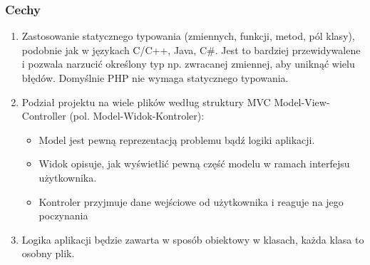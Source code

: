 \pagebreak


\subsubsection{Cechy}
\begin{enumerate}
    \item Zastosowanie statycznego typowania (zmiennych, funkcji, metod, pól klasy), podobnie jak w językach C/C++, Java, C\#. Jest to bardziej przewidywalene i pozwala narzucić określony typ np. zwracanej zmiennej, aby uniknąć wielu błędów. Domyślnie PHP nie wymaga statycznego typowania.
    \item Podział projektu na wiele plików według struktury MVC Model-View-Controller (pol. Model-Widok-Kontroler):
        \begin{itemize}
            \item Model jest pewną reprezentacją problemu bądź logiki aplikacji.
            \item Widok opisuje, jak wyświetlić pewną część modelu w ramach interfejsu użytkownika. 
            \item Kontroler przyjmuje dane wejściowe od użytkownika i reaguje na jego poczynania
        \end{itemize}
    \item Logika aplikacji będzie zawarta w sposób obiektowy w klasach, każda klasa to osobny  plik.
\end{enumerate}

